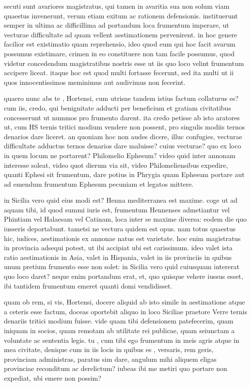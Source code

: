  secuti sunt avariores magistratus, qui tamen in avaritia sua non solum viam quaestus invenerunt, verum etiam exitum ac rationem defensionis. instituerunt semper in ultima ac difficillima ad portandum loca frumentum imperare, ut vecturae difficultate ad quam vellent aestimationem pervenirent. in hoc genere facilior est existimatio quam reprehensio, ideo quod eum qui hoc facit avarum possumus existimare, crimen in eo constituere non tam facile possumus, quod videtur concedendum magistratibus nostris esse ut iis quo loco velint frumentum accipere liceat. itaque hoc est quod multi fortasse fecerunt, sed ita multi ut ii quos innocentissimos meminimus aut audivimus non fecerint.

 quaero nunc abs te , Hortensi, cum utrisne tandem istius factum collaturus es? cum iis, credo, qui benignitate adducti per beneficium et gratiam civitatibus concesserunt ut nummos pro frumento darent. ita credo petisse ab isto aratores ut, cum HS ternis tritici modium vendere non possent, pro singulis modiis ternos denarios dare liceret. an quoniam hoc non audes dicere, illuc confugies, vecturae difficultate adductus ternos denarios dare maluisse? cuius vecturae? quo ex loco in quem locum ne portarent? Philomelio Ephesum? video quid inter annonam interesse soleat, video quot dierum via sit, video Philomeliensibus expedire, quanti Ephesi sit frumentum, dare potius in Phrygia quam Ephesum portare aut ad emendum frumentum Ephesum pecuniam et legatos mittere.

 in Sicilia vero quid eius modi est? Henna mediterranea est maxime. coge ut ad aquam tibi, id quod summi iuris est, frumentum Hennenses admetiantur vel Phintiam vel Halaesam vel Catinam, loca inter se maxime diversa: eodem die quo iusseris deportabunt. tametsi ne vectura quidem est opus. nam totus quaestus hic, iudices, aestimationis ex annonae natus est varietate. hoc enim magistratus in provincia adsequi potest, ut ibi accipiat ubi est carissimum. ideo valet ista ratio aestimationis in Asia, valet in Hispania, valet in iis provinciis in quibus unum pretium frumento esse non solet: in Sicilia vero quid cuiusquam intererat quo loco daret? neque enim portandum erat, et, quo quisque vehere iussus esset, ibi tantidem frumentum emeret quanti domi vendidisset.

 quam ob rem, si vis, Hortensi, docere aliquid ab isto simile in aestimatione atque a ceteris esse factum, doceas oportebit aliquo in loco Siciliae praetore Verre ternis denariis tritici modium fuisse. vide quam tibi defensionem patefecerim, quam iniquam in socios, quam remotam ab utilitate rei publicae, quam seiunctam a voluntate ac sententia legis. tu , cum tibi ego frumentum in meis agris atque in mea civitate, denique cum in iis locis in quibus es , versaris, rem geris, provinciam administras, paratus sim dare, angulum mihi aliquem eligas provinciae reconditum ac derelictum? iubeas ibi me metiri quo portare non expediat, ubi emere non possim?


